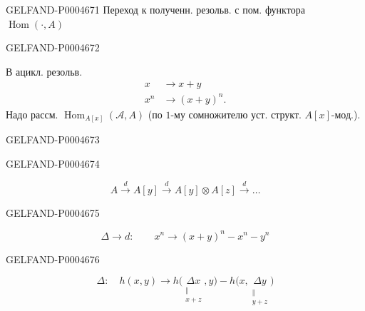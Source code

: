 \begin{GelfandAdjacentEvidence}{GELFAND-P000467}{1}
Переход к полученн. резольв. с пом. функтора $\operatorname{Hom}(\cdot,A)$
\end{GelfandAdjacentEvidence}
\begin{GelfandAdjacentEvidence}{GELFAND-P000467}{2}


В ацикл. резольв.
\[
\begin{aligned}
x&\longrightarrow x+y\\
x^n&\longrightarrow(x+y)^n.
\end{aligned}
\]
Надо рассм. $\operatorname{Hom}_{A[x]}(\mathcal A,A)$
(по $1$-му сомножителю уст. структ. $A[x]$-мод.).
\end{GelfandAdjacentEvidence}
\begin{GelfandAdjacentEvidence}{GELFAND-P000467}{3}

\end{GelfandAdjacentEvidence}
\begin{GelfandAdjacentEvidence}{GELFAND-P000467}{4}


\[
A\xrightarrow{d} A[y]\xrightarrow{d} A[y]\otimes A[z]\xrightarrow{d}\ldots
\]
\end{GelfandAdjacentEvidence}
\begin{GelfandAdjacentEvidence}{GELFAND-P000467}{5}

\[
\Delta\longrightarrow d:\qquad x^n\longrightarrow(x+y)^n-x^n-y^n
\]
\end{GelfandAdjacentEvidence}
\begin{GelfandAdjacentEvidence}{GELFAND-P000467}{6}

\[
\Delta:\quad h(x,y)\longrightarrow
h\bigl(\underset{\substack{\Vert\\x+z}}{\Delta x},y\bigr)
-
h\bigl(x,\underset{\substack{\Vert\\y+z}}{\Delta y}\bigr)
\]
\end{GelfandAdjacentEvidence}
